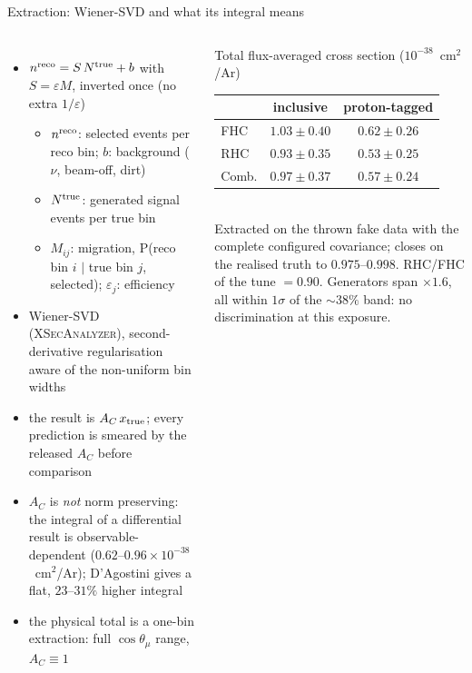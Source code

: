 \documentclass[aspectratio=169,10pt]{beamer}
\begin{document}
\begin{frame}{Extraction: Wiener-SVD and what its integral means}
  \small
  \begin{columns}[T]
  \begin{itemize}\itemsep1pt
    \item $n^{\rm reco}=S\,N^{\rm true}+b$ with $S=\varepsilon M$, inverted once (no extra $1/\varepsilon$)
      \begin{itemize}\scriptsize\itemsep0pt
        \item $n^{\rm reco}$: selected events per reco bin; $b$: background ($\nu$, beam-off, dirt)
        \item $N^{\rm true}$: generated signal events per true bin
        \item $M_{ij}$: migration, P(reco bin $i$ $|$ true bin $j$, selected); $\varepsilon_j$: efficiency
      \end{itemize}
    \item Wiener-SVD (\textsc{XSecAnalyzer}), second-derivative regularisation aware of the non-uniform bin widths
    \item the result is $A_C\,x_{\rm true}$; every prediction is smeared by the released $A_C$ before comparison
    \item $A_C$ is \emph{not} norm preserving: the integral of a differential result is observable-dependent
      ($0.62$--$0.96\times10^{-38}$~cm$^2$/Ar); D'Agostini gives a flat, $23$--$31\%$ higher integral
    \item \alert{the physical total is a one-bin extraction: full $\cos\theta_\mu$ range, $A_C\equiv1$}
  \end{itemize}
  \begin{block}{Total flux-averaged cross section ($10^{-38}$~cm$^2$/Ar)}
  \begin{tabular}{lcc}
  \toprule
  & inclusive & proton-tagged \\
  \midrule
  FHC  & $1.03\pm0.40$ & $0.62\pm0.26$ \\
  RHC  & $0.93\pm0.35$ & $0.53\pm0.25$ \\
  Comb.& $0.97\pm0.37$ & $0.57\pm0.24$ \\
  \bottomrule
  \end{tabular}\\[3pt]
  {\footnotesize Extracted on the thrown fake data with the complete configured covariance; closes on the realised truth to $0.975$--$0.998$. RHC/FHC of the tune $=0.90$. Generators span $\times1.6$, all within $1\sigma$ of the $\sim\!38\%$ band: no discrimination at this exposure.}
  \end{block}
  \end{columns}
\end{frame}
\end{document}
